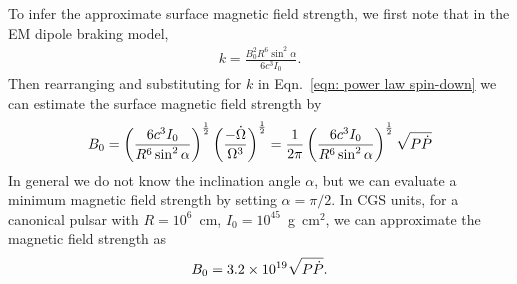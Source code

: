 To infer the approximate surface magnetic field strength, we first note that
in the EM dipole braking model,
\begin{align}
k = \frac{B_0^{2} R^{6} \sin^{2}\alpha}{6c^{3}I_0}.
\end{align}
Then rearranging and substituting for $k$ in Eqn.~\eqref{eqn: power law
spin-down} we can estimate the surface magnetic field strength by
\begin{equation}
    B_{0} = \left(\frac{6 c^{3} I_{0}}{R^{6} \sin^{2}\alpha}\right)^{\frac{1}{2}} 
            \left(\frac{-\dot{\Omega}}{\Omega^{3}}\right)^{\frac{1}{2}}
          = \frac{1}{2\pi}\left(\frac{6 c^{3} I_{0}}{R^{6} \sin^{2}\alpha}\right)^{\frac{1}{2}}
           \sqrt{P \dot{P}}
\label{eqn: surface magnetic field}
\end{equation}
In general we do not know the inclination angle $\alpha$, but we can evaluate a 
minimum magnetic field strength by setting $\alpha=\pi/2$. In CGS units, for a
canonical pulsar with $R=10^{6}$~cm, $I_{0}=10^{45}$~g~cm$^{2}$, we can approximate
the magnetic field strength as
\begin{equation}
    B_{0} = 3.2 \times 10^{19} \sqrt{P \dot{P}}.
\label{eqn: surface magnetic field canonical}
\end{equation}

